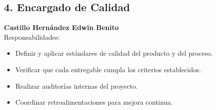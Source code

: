 \subsection*{4. Encargado de Calidad}
\textbf{Castillo Hernández Edwin Benito}\\
Responsabilidades:
\endgroup
\begin{itemize}
    \item Definir y aplicar estándares de calidad del producto y del proceso.
    \item Verificar que cada entregable cumpla los criterios establecidos.
    \item Realizar auditorías internas del proyecto.
    \item Coordinar retroalimentaciones para mejora continua.
\end{itemize}
